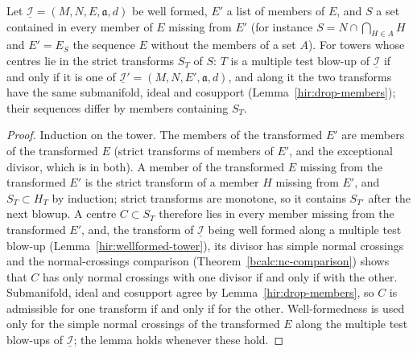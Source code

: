 \begin{lemma}
\label{hir:drop-containing-members}
\leanok
Let \(\underline{\mathcal I}=(M,N,E,\mathfrak a,d)\) be well formed, \(E'\) a list of members of \(E\), and \(S\) a set contained in every member of \(E\) missing from
\(E'\) (for instance \(S=N\cap\bigcap_{H\in A}H\) and \(E'=E_S\) the sequence \(E\) without the members of a set \(A\)). For towers whose centres lie in the
strict transforms \(S_T\) of \(S\): \(T\) is a multiple test blow-up of \(\underline{\mathcal I}\) if and only if it is one of
\(\underline{\mathcal I}'=(M,N,E',\mathfrak a,d)\), and along it the two transforms have the same submanifold, ideal and cosupport (Lemma~\ref{hir:drop-members});
their sequences differ by members containing \(S_T\).
\end{lemma}
\begin{proof}
\leanok
Induction on the tower. The members of the transformed \(E'\) are members of the transformed \(E\) (strict transforms of members of \(E'\), and the exceptional
divisor, which is in both). A member of the transformed \(E\) missing from the transformed \(E'\) is the strict transform of a member \(H\) missing from \(E'\),
and \(S_T\subset H_T\) by induction; strict transforms are monotone, so it contains \(S_{T'}\) after the next blowup. A centre \(C\subset S_T\) therefore
lies in every member missing from the transformed \(E'\), and, the transform of \(\underline{\mathcal I}\) being well formed along a multiple test blow-up
(Lemma~\ref{hir:wellformed-tower}), its divisor has simple normal crossings and the normal-crossings comparison (Theorem~\ref{bcalc:nc-comparison}) shows that \(C\)
has only normal crossings with one divisor if and only if with the other. Submanifold, ideal and cosupport agree by Lemma~\ref{hir:drop-members}, so \(C\) is
admissible for one transform if and only if for the other. Well-formedness is used only for the simple normal crossings of the transformed \(E\) along
the multiple test blow-ups of \(\underline{\mathcal I}\); the lemma holds whenever these hold.
\end{proof}
